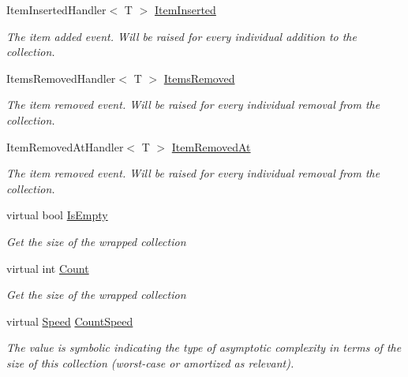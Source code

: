 \begin{DoxyCompactItemize}
Item\+Inserted\+Handler$<$ T $>$ \hyperlink{class_c5_1_1_guarded_collection_value_a3f96014a551bc419ff392b0603c5ea9b}{Item\+Inserted}
\begin{DoxyCompactList}\small\item\em The item added event. Will be raised for every individual addition to the collection. \end{DoxyCompactList}\item 
Items\+Removed\+Handler$<$ T $>$ \hyperlink{class_c5_1_1_guarded_collection_value_a85c761ac148d451a9bfc35647c4828fe}{Items\+Removed}
\begin{DoxyCompactList}\small\item\em The item removed event. Will be raised for every individual removal from the collection. \end{DoxyCompactList}\item 
Item\+Removed\+At\+Handler$<$ T $>$ \hyperlink{class_c5_1_1_guarded_collection_value_ae775067415ed075eab5ff22ed0cde2a4}{Item\+Removed\+At}
\begin{DoxyCompactList}\small\item\em The item removed event. Will be raised for every individual removal from the collection. \end{DoxyCompactList}\item 
virtual bool \hyperlink{class_c5_1_1_guarded_collection_value_aa567bdb55eab9d39405e1c09091afdbd}{Is\+Empty}
\begin{DoxyCompactList}\small\item\em Get the size of the wrapped collection \end{DoxyCompactList}\item 
virtual int \hyperlink{class_c5_1_1_guarded_collection_value_a88d2c0a3a91c948b46417c1e60b45d44}{Count}
\begin{DoxyCompactList}\small\item\em Get the size of the wrapped collection \end{DoxyCompactList}\item 
virtual \hyperlink{namespace_c5_a615ba88dcdaa8d5a3c5f833a73d7fad6}{Speed} \hyperlink{class_c5_1_1_guarded_collection_value_a1faa5213b85114c0611a39744edf8887}{Count\+Speed}
\begin{DoxyCompactList}\small\item\em The value is symbolic indicating the type of asymptotic complexity in terms of the size of this collection (worst-\/case or amortized as relevant). \end{DoxyCompactList}\end{DoxyCompactItemize}
